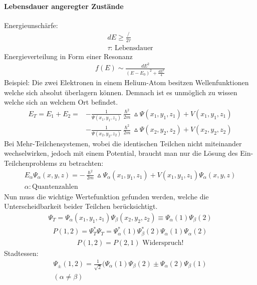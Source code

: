 \documentclass[10pt,a4paper]{article}
\begin{document}
\paragraph{Lebensdauer angeregter Zustände} $\,$ \\
Energieunschärfe:
\begin{align}
dE\geq \frac{\slash}{2 \tau} \\
 \tau \text{: Lebensdauer}
\end{align}
Energieverteilung in Form einer Resonanz
\begin{align}
f(E)\sim \frac{dE^2}{(E-E_0)^2+\frac{dE^2}{4}}
\end{align}
Beispiel: Die zwei Elektronen in einem Helium-Atom besitzen Wellenfunktionen welche sich absolut überlagern können. Demnach ist es unmöglich zu wissen welche sich an welchem Ort befindet.
\begin{align}
E_T=E_1+E_2 = &-\frac{1}{\Psi(x_1, y_1, z_1)} \frac{\hslash^2}{2m} \vartriangle \Psi (x_1, y_1, z_1) +V(x_1, y_1, z_1)\\ &- \frac{1}{\Psi(x_2, y_2, z_2)} \frac{\hslash^2}{2m} \vartriangle \Psi (x_2, y_2, z_2) +V(x_2, y_2, z_2)
\end{align}
Bei Mehr-Teilchensystemen, wobei die identischen Teilchen nicht miteinander wechselwirken, jedoch mit einem Potential, braucht man nur die Lösung des Ein-Teilchenproblems zu betrachten:
\begin{align}
E_{\alpha} \Psi_{\alpha} (x, y, z) = -\frac{\hslash^2}{2m} \vartriangle \Psi_{\alpha} (x_1, y_1, z_1) +V(x_1, y_1, z_1) \Psi_{\alpha} (x, y, z) \\
\alpha: \text{Quantenzahlen}
\end{align}
Nun muss die wichtige Wertefunktion gefunden werden, welche die Unterscheidbarkeit beider Teilchen berücksichtigt.
\begin{align}
\Psi_T=\Psi_{\alpha} (x_1, y_1, z_1) \Psi_{\beta} (x_2, y_2, z_2) \equiv \Psi_{\alpha} (1) \Psi_{\beta} (2)
\end{align}
\begin{align}
P(1,2)=\Psi_T^* \Psi_T =\Psi_{\alpha} ^* (1) \Psi_{\beta} ^* (2) \Psi_{\alpha} (1) \Psi_{\alpha} (2)
\end{align}
\begin{align}
P(1,2) = P(2,1) \text{ Widerspruch!}
\end{align}
Stadtessen:
\begin{align}
\Psi_{\pm} (1,2)= \frac{1}{\sqrt{2}} (\Psi_{\alpha}(1) \Psi_{\beta}(2) \pm \Psi_{\alpha}(2) \Psi_{\beta}(1) \\
(\alpha \neq \beta)
\end{align}
\end{document}
